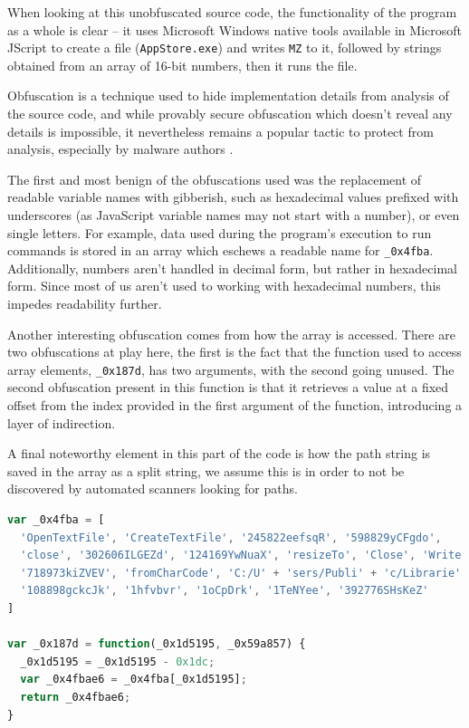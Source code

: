 When looking at this unobfuscated source code, the functionality of the program as a whole is clear -- it uses Microsoft
Windows native tools available in Microsoft JScript to create a file (\verb+AppStore.exe+) and writes \verb+MZ+ to it,
followed by strings obtained from an array of 16-bit numbers, then it runs the file.

Obfuscation is a technique used to hide implementation details from analysis of the source code, and while provably
secure obfuscation which doesn't reveal any details is impossible, it nevertheless remains a popular tactic to 
protect from analysis, especially by malware authors \cite{obfuscation}. 

The first and most benign of the obfuscations used was the replacement of readable variable names with gibberish, such
as hexadecimal values prefixed with underscores (as JavaScript variable names may not start with a number), or even
single letters. For example, data used during the program's execution to run commands is stored in an array which
eschews a readable name for \verb+_0x4fba+. Additionally, numbers aren't handled in decimal form, but rather in
hexadecimal form. Since most of us aren't used to working with hexadecimal numbers, this impedes readability further.

Another interesting obfuscation comes from how the array is accessed. There are two obfuscations at play here, the
first is the fact that the function used to access array elements, \verb+_0x187d+, has two arguments, with the second
going unused. The second obfuscation present in this function is that it retrieves a value at a fixed offset from the
index provided in the first argument of the function, introducing a layer of indirection.

A final noteworthy element in this part of the code is how the path string is saved in the array as a split string, we
assume this is in order to not be discovered by automated scanners looking for paths.

\begin{lstlisting}[language=JavaScript, label={lst:obfuscated-access}, caption={Obfuscated data retrieval from an array.}]
var _0x4fba = [
  'OpenTextFile', 'CreateTextFile', '245822eefsqR', '598829yCFgdo',
  'close', '302606ILGEZd', '124169YwNuaX', 'resizeTo', 'Close', 'Write',
  '718973kiZVEV', 'fromCharCode', 'C:/U' + 'sers/Publi' + 'c/Librarie' +'s/App' + 'Store.e' + 'xe',
  '108898gckcJk', '1hfvbvr', '1oCpDrk', '1TeNYee', '392776SHsKeZ'
]

var _0x187d = function(_0x1d5195, _0x59a857) {
  _0x1d5195 = _0x1d5195 - 0x1dc;
  var _0x4fbae6 = _0x4fba[_0x1d5195];
  return _0x4fbae6;
}
\end{lstlisting}

